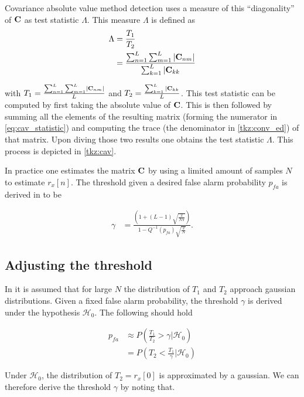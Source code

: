 \documentclass[a4paper, openany, oneside]{memoir}
\begin{document}
Covariance absolute value method detection uses a measure of this ``diagonality'' of $\boldsymbol{\mathbf{C}}$ as test statistic $\Lambda$.
This measure $\Lambda$ is defined as
\begin{align}\label{eq:cav_statistic}
\Lambda &= \frac{T_1}{T_2} \nonumber \\
&=\frac{\sum_{n=1}^{L} \sum_{m=1}^L \left|\boldsymbol{\mathbf{C}}_{nm}\right|}{\sum_{k=1}^L |\boldsymbol{\mathbf{C}}_{kk}}
\end{align} 

with $T_1 = \frac{\sum_{n=1}^{L} \sum_{m=1}^L \left|\boldsymbol{\mathbf{C}}_{nm}\right|}{L}$ and
$T_2 = \frac{\sum_{k=1}^L |\boldsymbol{\mathbf{C}}_{kk}}{L}$.
This test statistic can be computed by first taking the absolute value of $\boldsymbol{\mathbf{C}}$. This is then followed by summing all the elements of the resulting matrix (forming the numerator in \cref{eq:cav_statistic}) and computing the trace (the denominator in \cref{tkz:conv_ed}) of that matrix. Upon diving those two results one obtains the test statistic $\Lambda$. This process is depicted in \cref{tkz:cav}.

In practice one estimates the matrix $\boldsymbol{\mathbf{C}}$ by using a limited amount of samples $N$ to estimate $r_x[n]$. The threshold given a desired false alarm probability
$p_{fa}$ is derived in \cite{zheng2009spectrum} to be

\begin{align*}
\gamma &= \frac{\left(1+(L-1)\sqrt{\frac{2}{N\pi}}\right)}{1-Q^{-1}(p_{fa})\sqrt{\frac{2}{N}}}.
\end{align*} 

\subsection{Adjusting the threshold}\label{eq:threshold_cav_deriv}
In \cite{zheng2009spectrum} it is assumed that for large $N$ the distribution of $T_1$ and $T_2$ approach gaussian distributions. Given a fixed false alarm probability, the threshold $\gamma$ is derived under the hypothesis $\mathcal{H}_0$. The following should hold

\begin{align*}
p_{fa} &\approx P\left(\frac{T_1}{T_2} > \gamma \big | \mathcal{H}_0\right) \\
&= P\left(T_2 < \frac{T_1}{\gamma} \big | \mathcal{H}_0\right)
\end{align*}

Under $\mathcal{H}_0$, the distribution of $T_2 = r_x[0]$ is approximated by a gaussian. We can therefore derive the
threshold $\gamma$ by noting that.
\end{document}
